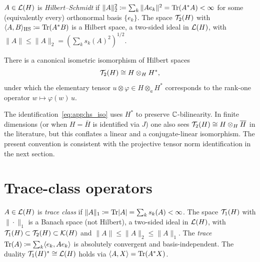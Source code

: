 \begin{definition}
\label{def:app:hs}
$A \in \mathcal{L}(H)$ is \emph{Hilbert--Schmidt} if
$\|A\|_2^2 \coloneqq \sum_k \|Ae_k\|^2 = \mathrm{Tr}(A^*A) < \infty$
for some (equivalently every) orthonormal basis $\{e_k\}$.
The space $\mathcal{T}_{2}(H)$ with $\langle A, B\rangle_{\mathrm{HS}}
\coloneqq \mathrm{Tr}(A^*B)$ is a Hilbert space, a two-sided ideal in
$\mathcal{L}(H)$, with $\|A\| \leq \|A\|_2 = (\sum_k s_k(A)^2)^{1/2}$.
\end{definition}

\begin{theorem}
\label{thm:app:hs_tensor}
There is a canonical isometric isomorphism of Hilbert spaces
\begin{equation}
\label{eq:app:hs_iso}
    \mathcal{T}_{2}(H) \cong H \otimes_H H^*,
\end{equation}
under which the elementary tensor $u \otimes \varphi \in H \otimes_a H^*$
corresponds to the rank-one operator $w \mapsto \varphi(w)\, u$.
\end{theorem}

\begin{remark}
\label{rem:app:hs_tensor}
The identification~\eqref{eq:app:hs_iso} uses $H^*$ to preserve
$\mathbb{C}$-bilinearity. In finite dimensions (or when $H = \overline{H}$ is
identified via $J$) one also sees $\mathcal{T}_{2}(H) \cong H \otimes_H \overline{H}$
in the literature, but this conflates a linear and a conjugate-linear
isomorphism. The present convention is consistent with the projective
tensor norm identification in the next section.
\end{remark}

\section{Trace-class operators}
\label{app:quantum:trace}

\begin{definition}
\label{def:app:trace_class}
$A \in \mathcal{L}(H)$ is \emph{trace class} if
$\|A\|_1 \coloneqq \mathrm{Tr}|A| = \sum_k s_k(A) < \infty$.
The space $\mathcal{T}_{1}(H)$ with $\|\cdot\|_1$ is a Banach space (not Hilbert),
a two-sided ideal in $\mathcal{L}(H)$, with $\mathcal{T}_{1}(H) \subset \mathcal{T}_{2}(H) \subset
\mathcal{K}(H)$ and $\|A\| \leq \|A\|_2 \leq \|A\|_1$.
The \emph{trace} $\mathrm{Tr}(A) \coloneqq \sum_k \langle e_k, Ae_k\rangle$
is absolutely convergent and basis-independent.
The duality $\mathcal{T}_{1}(H)^* \cong \mathcal{L}(H)$ holds via $\langle A, X\rangle
= \mathrm{Tr}(A^*X)$.
\end{definition}

